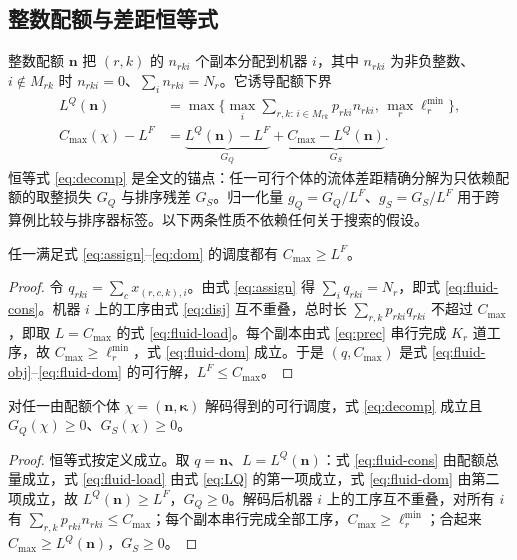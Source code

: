 \subsection{整数配额与差距恒等式}\label{sec:gap}
整数配额 $\mathbf{n}$ 把 $(r,k)$ 的 $n_{rki}$ 个副本分配到机器 $i$，其中 $n_{rki}$ 为非负整数、$i \notin M_{rk}$ 时 $n_{rki} = 0$、$\sum_i n_{rki} = N_r$。它诱导配额下界
\begin{align}
L^Q(\mathbf{n}) &= \max\{ \max_i \textstyle\sum_{r,k:\, i \in M_{rk}} p_{rki} n_{rki},\, \max_r \ell_r^{\min} \}, \label{eq:LQ}\\
C_{\max}(\chi) - L^F &= \underbrace{L^Q(\mathbf{n}) - L^F}_{G_Q} + \underbrace{C_{\max} - L^Q(\mathbf{n})}_{G_S}. \label{eq:decomp}
\end{align}
恒等式 \eqref{eq:decomp} 是全文的锚点：任一可行个体的流体差距精确分解为只依赖配额的取整损失 $G_Q$ 与排序残差 $G_S$。归一化量 $g_Q = G_Q/L^F$、$g_S = G_S/L^F$ 用于跨算例比较与排序器标签。以下两条性质不依赖任何关于搜索的假设。

\begin{proposition}[流体下界]\label{prop:fluidlb}
任一满足式 \eqref{eq:assign}--\eqref{eq:dom} 的调度都有 $C_{\max} \ge L^F$。
\end{proposition}
\begin{proof}
令 $q_{rki} = \sum_c x_{(r,c,k),i}$。由式 \eqref{eq:assign} 得 $\sum_i q_{rki} = N_r$，即式 \eqref{eq:fluid-cons}。机器 $i$ 上的工序由式 \eqref{eq:disj} 互不重叠，总时长 $\sum_{r,k} p_{rki} q_{rki}$ 不超过 $C_{\max}$，即取 $L = C_{\max}$ 的式 \eqref{eq:fluid-load}。每个副本由式 \eqref{eq:prec} 串行完成 $K_r$ 道工序，故 $C_{\max} \ge \ell_r^{\min}$，式 \eqref{eq:fluid-dom} 成立。于是 $(q, C_{\max})$ 是式 \eqref{eq:fluid-obj}--\eqref{eq:fluid-dom} 的可行解，$L^F \le C_{\max}$。
\end{proof}

\begin{proposition}[非负分解]\label{prop:decomp}
对任一由配额个体 $\chi = (\mathbf{n}, \boldsymbol{\kappa})$ 解码得到的可行调度，式 \eqref{eq:decomp} 成立且 $G_Q(\chi) \ge 0$、$G_S(\chi) \ge 0$。
\end{proposition}
\begin{proof}
恒等式按定义成立。取 $q = \mathbf{n}$、$L = L^Q(\mathbf{n})$：式 \eqref{eq:fluid-cons} 由配额总量成立，式 \eqref{eq:fluid-load} 由式 \eqref{eq:LQ} 的第一项成立，式 \eqref{eq:fluid-dom} 由第二项成立，故 $L^Q(\mathbf{n}) \ge L^F$，$G_Q \ge 0$。解码后机器 $i$ 上的工序互不重叠，对所有 $i$ 有 $\sum_{r,k} p_{rki} n_{rki} \le C_{\max}$；每个副本串行完成全部工序，$C_{\max} \ge \ell_r^{\min}$；合起来 $C_{\max} \ge L^Q(\mathbf{n})$，$G_S \ge 0$。
\end{proof}
